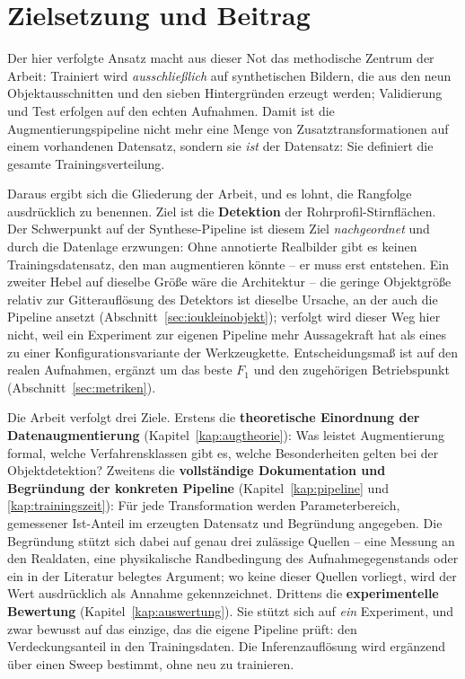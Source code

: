 \section{Zielsetzung und Beitrag}

Der hier verfolgte Ansatz macht aus dieser Not das methodische Zentrum der
Arbeit: Trainiert wird \emph{ausschließlich} auf synthetischen Bildern, die aus
den neun Objektausschnitten und den sieben Hintergründen erzeugt werden;
Validierung und Test erfolgen auf den echten Aufnahmen. Damit ist die
Augmentierungspipeline nicht mehr eine Menge von Zusatztransformationen auf einem
vorhandenen Datensatz, sondern sie \emph{ist} der Datensatz: Sie definiert die
gesamte Trainingsverteilung.

Daraus ergibt sich die Gliederung der Arbeit, und es lohnt, die Rangfolge
ausdrücklich zu benennen. Ziel ist die \textbf{Detektion} der
Rohrprofil-Stirnflächen. Der Schwerpunkt auf der Synthese-Pipeline ist diesem Ziel
\emph{nachgeordnet} und durch die Datenlage erzwungen: Ohne annotierte Realbilder
gibt es keinen Trainingsdatensatz, den man augmentieren könnte -- er muss erst
entstehen. Ein zweiter Hebel auf dieselbe Größe wäre die Architektur -- die
geringe Objektgröße relativ zur Gitterauflösung des Detektors ist dieselbe
Ursache, an der auch die Pipeline ansetzt (Abschnitt~\ref{sec:ioukleinobjekt});
verfolgt wird dieser Weg hier nicht, weil ein Experiment zur eigenen Pipeline
mehr Aussagekraft hat als eines zu einer Konfigurationsvariante der
Werkzeugkette. Entscheidungsmaß ist \mAPfifty{} auf den realen Aufnahmen,
ergänzt um das beste $F_1$ und den zugehörigen Betriebspunkt
(Abschnitt~\ref{sec:metriken}).

Die Arbeit verfolgt drei Ziele. Erstens die \textbf{theoretische Einordnung der
Datenaugmentierung} (Kapitel~\ref{kap:augtheorie}): Was leistet Augmentierung
formal, welche Verfahrensklassen gibt es, welche Besonderheiten gelten bei der
Objektdetektion? Zweitens die \textbf{vollständige Dokumentation und Begründung
der konkreten Pipeline} (Kapitel~\ref{kap:pipeline} und
\ref{kap:trainingszeit}): Für jede Transformation werden Parameterbereich,
gemessener Ist-Anteil im erzeugten Datensatz und Begründung angegeben. Die
Begründung stützt sich dabei auf genau drei zulässige Quellen -- eine Messung an
den Realdaten, eine physikalische Randbedingung des Aufnahmegegenstands oder ein
in der Literatur belegtes Argument; wo keine dieser Quellen vorliegt, wird der
Wert ausdrücklich als Annahme gekennzeichnet. Drittens die
\textbf{experimentelle Bewertung} (Kapitel~\ref{kap:auswertung}). Sie stützt
sich auf \emph{ein} Experiment, und zwar bewusst auf das einzige, das die eigene
Pipeline prüft: den Verdeckungsanteil in den Trainingsdaten. Die
Inferenzauflösung wird ergänzend über einen Sweep bestimmt, ohne neu zu
trainieren.

